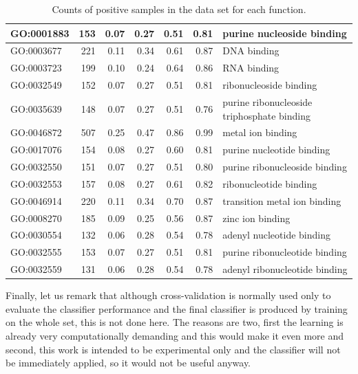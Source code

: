 \documentclass[11pt,twoside,a4paper]{book}
\begin{document}
\begin{table}
\begin{small}
\begin{center}
\begin{tabular}{lrrrrrl}
GO:0001883  &  153   &  0.07  & 0.27 & 0.51 & 0.81 &    purine nucleoside binding \\ \hline
GO:0003677  &  221   &  0.11  & 0.34 & 0.61 & 0.87 &    DNA binding \\ \hline
GO:0003723  &  199   &  0.10  & 0.24 & 0.64 & 0.86 &   RNA binding \\ \hline
GO:0032549  &  152   &  0.07  & 0.27 & 0.51 & 0.81 &    ribonucleoside binding \\ \hline
GO:0035639  &  148   &  0.07  & 0.27 & 0.51 & 0.76 &  purine ribonucleoside triphosphate binding \\ \hline
GO:0046872  &  507   &  0.25  & 0.47 & 0.86 & 0.99 &    metal ion binding \\ \hline
GO:0017076  &  154   &  0.08  & 0.27 & 0.60 & 0.81 &    purine nucleotide binding \\ \hline
GO:0032550  &  151   &  0.07  & 0.27 & 0.51 & 0.80 &   purine ribonucleoside binding \\ \hline
GO:0032553  &  157   &  0.08  & 0.27 & 0.61 & 0.82 & ribonucleotide binding \\ \hline
GO:0046914  &  220   &  0.11  & 0.34 & 0.70 & 0.87 &    transition metal ion binding \\ \hline
GO:0008270  &  185   &  0.09  & 0.25 & 0.56 & 0.87 &    zinc ion binding \\ \hline
GO:0030554  &  132   &  0.06  & 0.28 & 0.54 & 0.78 &   adenyl nucleotide binding \\ \hline
GO:0032555  &  153   &  0.07  & 0.27 & 0.51 & 0.81 &    purine ribonucleotide binding \\ \hline
GO:0032559  &  131   &  0.06  & 0.28 & 0.54 & 0.78 &   adenyl ribonucleotide binding \\ \hline
\end{tabular}
\end{center}
\end{small}
\caption{Counts of positive samples in the data set for each function.}
\label{table:terms}
\end{table}

Finally, let us remark that although cross-validation is normally used only to evaluate
the classifier performance and the final classifier is produced by training 
on the whole set, this is not done here.
The reasons are two, first the learning is already very computationally demanding
and this would make it even more and second, this work
is intended to be experimental only and the classifier will not be 
immediately applied, so it would not be useful anyway.
\end{document}
